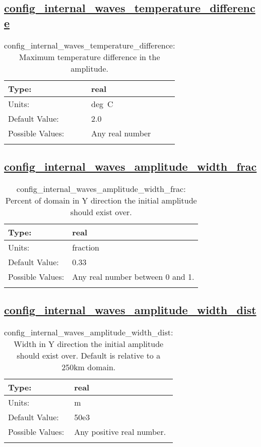 \subsection[config\_internal\_waves\_temperature\_difference]{\hyperref[sec:nm_tab_internal_waves]{config\_internal\_waves\_temperature\_difference}}
\label{subsec:nm_sec_config_internal_waves_temperature_difference}
\begin{center}
\begin{longtable}{| p{2.0in} || p{4.0in} |}
    \hline
    Type: & real \\
    \hline
    Units: & \si{deg.C} \\
    \hline
    Default Value: & 2.0 \\
    \hline
    Possible Values: & Any real number \\
    \hline
    \caption{config\_internal\_waves\_temperature\_difference: Maximum temperature difference in the amplitude.}
\end{longtable}
\end{center}
\subsection[config\_internal\_waves\_amplitude\_width\_frac]{\hyperref[sec:nm_tab_internal_waves]{config\_internal\_waves\_amplitude\_width\_frac}}
\label{subsec:nm_sec_config_internal_waves_amplitude_width_frac}
\begin{center}
\begin{longtable}{| p{2.0in} || p{4.0in} |}
    \hline
    Type: & real \\
    \hline
    Units: & \si{fraction} \\
    \hline
    Default Value: & 0.33 \\
    \hline
    Possible Values: & Any real number between 0 and 1. \\
    \hline
    \caption{config\_internal\_waves\_amplitude\_width\_frac: Percent of domain in Y direction the initial amplitude should exist over.}
\end{longtable}
\end{center}
\subsection[config\_internal\_waves\_amplitude\_width\_dist]{\hyperref[sec:nm_tab_internal_waves]{config\_internal\_waves\_amplitude\_width\_dist}}
\label{subsec:nm_sec_config_internal_waves_amplitude_width_dist}
\begin{center}
\begin{longtable}{| p{2.0in} || p{4.0in} |}
    \hline
    Type: & real \\
    \hline
    Units: & \si{m} \\
    \hline
    Default Value: & 50e3 \\
    \hline
    Possible Values: & Any positive real number. \\
    \hline
    \caption{config\_internal\_waves\_amplitude\_width\_dist: Width in Y direction the initial amplitude should exist over. Default is relative to a 250km domain.}
\end{longtable}
\end{center}
